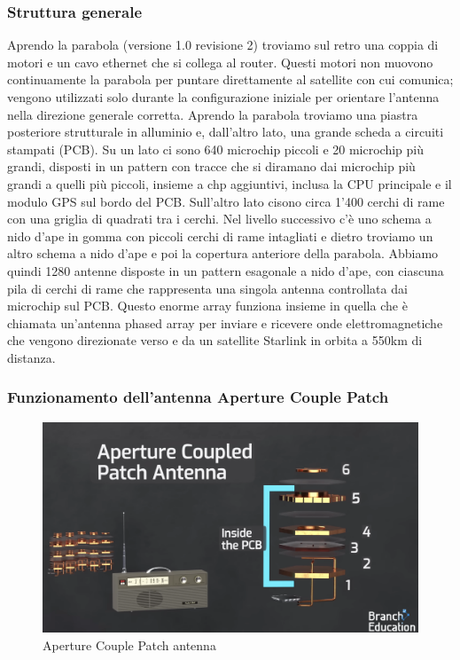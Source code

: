 \subsubsection{Struttura generale}
Aprendo la parabola (versione 1.0 revisione 2) troviamo sul retro una coppia di motori e un cavo ethernet che si collega al router.
Questi motori non muovono continuamente la parabola per puntare direttamente al satellite con cui comunica; vengono utilizzati solo durante la configurazione iniziale per orientare l'antenna nella direzione generale corretta.
Aprendo la parabola troviamo una piastra posteriore strutturale in alluminio e, dall'altro lato, una grande scheda a circuiti stampati (PCB).
Su un lato ci sono 640 microchip piccoli e 20 microchip più grandi, disposti in un pattern con tracce che si diramano dai microchip più grandi a quelli più piccoli, insieme a chp aggiuntivi, inclusa la CPU principale e il modulo GPS sul bordo del PCB. Sull'altro lato cisono circa 1'400 cerchi di rame con una griglia di quadrati tra i cerchi.
Nel livello successivo c'è uno schema a nido d'ape in gomma con piccoli cerchi di rame intagliati e dietro troviamo un altro schema a nido d'ape e poi la copertura anteriore della parabola.
Abbiamo quindi 1280 antenne disposte in un pattern esagonale a nido d'ape, con ciascuna pila di cerchi di rame che rappresenta una singola antenna controllata dai microchip sul PCB.
Questo enorme array funziona insieme in quella che è chiamata un'antenna phased array per inviare e ricevere onde elettromagnetiche che vengono direzionate verso e da un satellite Starlink in orbita a 550km di distanza.\cite{branch_education_how_2022}

\subsubsection{Funzionamento dell'antenna Aperture Couple Patch}

\begin{figure}[htbp]
  \centering
  \includegraphics[width=0.8\linewidth]{./res/img/antenna_pcb.png}
  \caption{Aperture Couple Patch antenna \cite{branch_education_how_2022}}
  \label{fig:aperture-couple-patch-antenna}
\end{figure}


